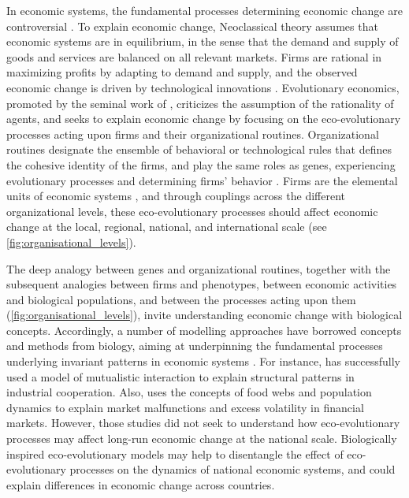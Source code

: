 In economic systems, the fundamental processes determining economic change are controversial \citep{Dopfer2007,Nelson2014,Hodgson2019}. 
%
To explain economic change, Neoclassical theory \citep{10.1093/cje/bet027} assumes that economic systems are in equilibrium, in the sense that the demand and supply of goods and services are balanced on all relevant markets. 
% 
Firms are rational in maximizing profits by adapting to demand and supply, and the observed economic change is driven by technological innovations \citep{Romer1986}.
% 
Evolutionary economics, promoted by the seminal work of \cite{Nelson2014}, criticizes the assumption of the rationality of agents, and seeks to explain economic change by focusing on the eco-evolutionary processes acting upon firms and their organizational routines.
% 
Organizational routines designate the ensemble of behavioral or technological rules that defines the cohesive identity of the firms, and play the same roles as genes, experiencing evolutionary processes and determining firms' behavior \citep{nelson1985evolutionary}. Firms are the elemental units of economic systems \cite{nelson1985evolutionary}, and through couplings across the different organizational levels, these eco-evolutionary processes should affect economic change at the local, regional, national, and international scale (see \cref{fig:organisational_levels}).

The deep analogy between genes and organizational routines, together with the subsequent analogies between firms and phenotypes, between economic activities and biological populations, and between the processes acting upon them (\cref{fig:organisational_levels}), invite understanding economic change with biological concepts.
% 
Accordingly, a number of modelling approaches have borrowed concepts and methods from biology, aiming at underpinning the fundamental processes underlying invariant patterns in economic systems \citep{Tacchella2018,Saavedra2009a,Scholl2020,Zhang2018,Modis1997,Saavedra2014,Farmer1999,Michalakelis2011,Marasco2016,Gatabazi2019,Cauwels56,Applegate2021,Suweis2015}. 
% 
For instance, \cite{Saavedra2009a} has successfully used a model of mutualistic interaction to explain structural patterns in industrial cooperation.
% 
Also, \cite{Scholl2020} uses the concepts of food webs and population dynamics to explain market malfunctions and excess volatility in financial markets.
% 
However, those studies did not seek to understand how eco-evolutionary processes may affect long-run economic change at the national scale.
% 
Biologically inspired eco-evolutionary models may help to disentangle the effect of eco-evolutionary processes on the dynamics of national economic systems, and could explain differences in economic change across countries.

